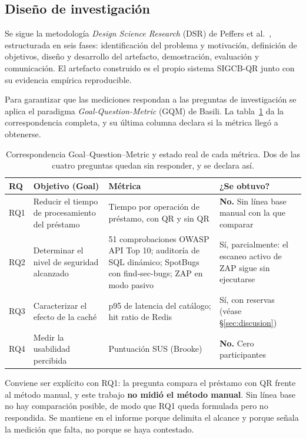 \documentclass[11pt,a4paper]{article}
\begin{document}
\subsection{Diseño de investigación}

Se sigue la metodología \emph{Design Science Research} (DSR) de
Peffers et al.~\cite{peffers2007design}, estructurada en seis fases:
identificación del problema y motivación, definición de objetivos, diseño y
desarrollo del artefacto, demostración, evaluación y comunicación. El artefacto
construido es el propio sistema SIGCB-QR junto con su evidencia empírica
reproducible.

Para garantizar que las mediciones respondan a las preguntas de investigación se
aplica el paradigma \emph{Goal-Question-Metric} (GQM) de Basili. La
tabla~\ref{tab:gqm} da la correspondencia completa, y su última columna declara
si la métrica llegó a obtenerse.

\begin{table}[htbp]
\centering
\small
\begin{tabular}{@{}p{0.9cm}p{4.6cm}p{6.2cm}p{2.7cm}@{}}
\toprule
\textbf{RQ} & \textbf{Objetivo (Goal)} & \textbf{Métrica} & \textbf{¿Se obtuvo?} \\
\midrule
RQ1 & Reducir el tiempo de procesamiento del préstamo & Tiempo por operación de préstamo, con QR y sin QR & \textbf{No.} Sin línea base manual con la que comparar \\
RQ2 & Determinar el nivel de seguridad alcanzado & 51 comprobaciones OWASP API Top 10; auditoría de SQL dinámico; SpotBugs con find-sec-bugs; ZAP en modo pasivo & Sí, parcialmente: el escaneo activo de ZAP sigue sin ejecutarse \\
RQ3 & Caracterizar el efecto de la caché & p95 de latencia del catálogo; hit ratio de Redis & Sí, con reservas (véase §\ref{sec:discusion}) \\
RQ4 & Medir la usabilidad percibida & Puntuación SUS (Brooke) & \textbf{No.} Cero participantes \\
\bottomrule
\end{tabular}
\caption{Correspondencia Goal--Question--Metric y estado real de cada métrica.
Dos de las cuatro preguntas quedan sin responder, y se declara así.}
\label{tab:gqm}
\end{table}

Conviene ser explícito con RQ1: la pregunta compara el préstamo con QR frente al
método manual, y este trabajo \textbf{no midió el método manual}. Sin línea base
no hay comparación posible, de modo que RQ1 queda formulada pero no respondida.
Se mantiene en el informe porque delimita el alcance y porque señala la medición
que falta, no porque se haya contestado.
\end{document}
